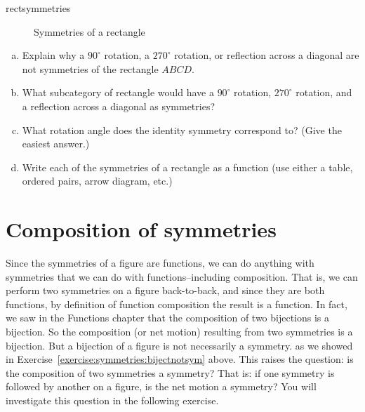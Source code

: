 \begin{example}{rectsymmetries}
\begin{figure}[htb]
\begin{center}
\caption{\label{SymmOfRect}Symmetries of a rectangle}
\end{center}
\end{figure}
\end{example}

\begin{exercise}{10}
\begin{enumerate}[(a)]
\item
Explain why a $90^\circ$ rotation, a $270^\circ$ rotation, or reflection across a diagonal are not symmetries  of the rectangle $ABCD$.
\item
What subcategory of rectangle would have a $90^\circ$ rotation, $270^\circ$ rotation, and a reflection across a diagonal as symmetries?
\item
What rotation angle does the identity symmetry correspond to? (Give the easiest answer.)
\item
Write each of the symmetries of a rectangle as a function (use either a table, ordered pairs, arrow diagram, etc.)
\end{enumerate}
\end{exercise}  


\section{Composition of symmetries}\label{composition}

Since the symmetries of a figure are functions, we can do anything with symmetries that we can do with functions--including composition.  That is,  we can perform two symmetries on a figure back-to-back, and since they are both functions, by definition of function composition the result is a function.  In fact, we saw in the Functions chapter that the composition of two bijections is a bijection.  So the composition (or net motion) resulting from two symmetries is a bijection.  But a bijection of a figure is not necessarily a symmetry. as we showed in Exercise~\ref{exercise:symmetries:bijectnotsym} above.  This raises the question:  is the composition of two symmetries a symmetry?  That is: if one symmetry is followed by another on a figure, is the net motion a symmetry?  You will investigate this question in the following exercise.

